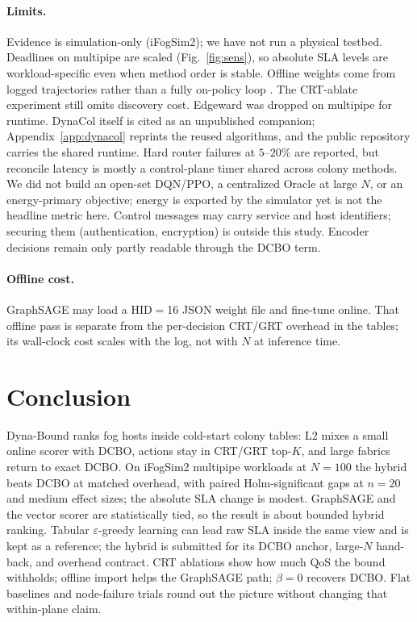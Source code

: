 \documentclass[pdflatex,sn-mathphys-num,iicol]{sn-jnl}
\begin{document}
\paragraph{Limits.}
\label{sec:limits}
Evidence is simulation-only (iFogSim2); we have not run a physical testbed.
Deadlines on multipipe are scaled (Fig.~\ref{fig:sens}), so absolute SLA levels
are workload-specific even when method order is stable. Offline weights come
from logged trajectories rather than a fully on-policy loop
\cite{levine_offline_rl2020}. The CRT-ablate experiment still omits discovery
cost. Edgeward was dropped on multipipe for runtime. DynaCol itself is cited as
an unpublished companion; Appendix~\ref{app:dynacol} reprints the reused
algorithms, and the public repository carries the shared runtime. Hard router
failures at $5$--$20\%$ are reported, but reconcile latency is mostly a
control-plane timer shared across colony methods. We did not build an open-set
DQN/PPO, a centralized Oracle at large $N$, or an energy-primary objective;
energy is exported by the simulator yet is not the headline metric here.
Control messages may carry service and host identifiers; securing them
(authentication, encryption) is outside this study. Encoder decisions remain
only partly readable through the DCBO term.

\paragraph{Offline cost.}
GraphSAGE may load a HID$=$16 JSON weight file and fine-tune online. That
offline pass is separate from the per-decision CRT/GRT overhead in the tables;
its wall-clock cost scales with the log, not with $N$ at inference time.

\section{Conclusion}
\label{sec:conc}

Dyna-Bound ranks fog hosts inside cold-start colony tables: L2 mixes a small
online scorer with DCBO, actions stay in CRT/GRT top-$K$, and large fabrics
return to exact DCBO. On iFogSim2 multipipe workloads at $N{=}100$ the hybrid
beats DCBO at matched overhead, with paired Holm-significant gaps at $n{=}20$
and medium effect sizes; the absolute SLA change is modest. GraphSAGE and the
vector scorer are statistically tied, so the result is about bounded hybrid
ranking. Tabular $\varepsilon$-greedy learning can lead raw SLA inside the same
view and is kept as a reference; the hybrid is submitted for its DCBO anchor,
large-$N$ hand-back, and overhead contract. CRT ablations show how much QoS the
bound withholds; offline import helps the GraphSAGE path; $\beta{=}0$ recovers
DCBO. Flat baselines and node-failure trials round out the picture without
changing that within-plane claim.
\end{document}
